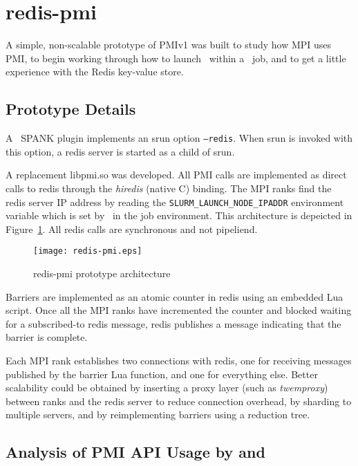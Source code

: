 \section{redis-pmi}

A simple, non-scalable prototype of PMIv1 was built to study
how MPI uses PMI, to begin working through how to launch \ngrm\ 
within a \slurm\ job, and to get a little experience with the Redis
key-value store.

\subsection{Prototype Details}

A \slurm\ SPANK plugin implements an srun option {\tt --redis}.
When srun is invoked with this option, a redis server is started
as a child of srun.

A replacement libpmi.so was developed.  All PMI calls are implemented
as direct calls to redis through the {\em hiredis} (native C) binding.
The MPI ranks find the redis server IP address by reading the
{\tt SLURM\_LAUNCH\_NODE\_IPADDR} environment variable which is set
by \slurm\ in the job environment.  This architecture is depeicted in
Figure~\ref{fig:redispmi}.
All redis calls are synchronous and not pipeliend.

\begin{figure}
\centering
\texttt{[image: redis-pmi.eps]}
\caption{redis-pmi prototype architecture}
\label{fig:redispmi}
\end{figure}

Barriers are implemented as an atomic counter in redis using an embedded
Lua script.
Once all the MPI ranks have incremented the counter and blocked waiting
for a subscribed-to redis message, redis publishes a message indicating
that the barrier is complete.

Each MPI rank establishes two connections with redis, one for receiving
messages published by the barrier Lua function, and one for everything else.
Better scalability could be obtained by inserting a proxy layer (such as
{\em twemproxy}) between ranks and the redis server to reduce connection
overhead, by sharding to multiple servers, and by reimplementing barriers
using a reduction tree.

\subsection{Analysis of PMI API Usage by  and \openmpi}

